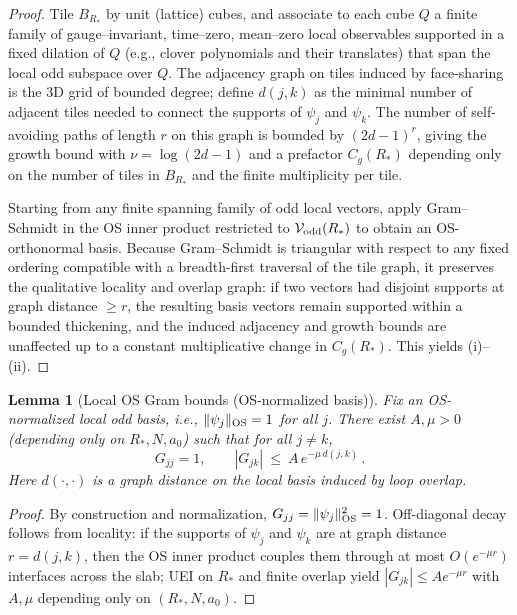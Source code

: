 \documentclass[11pt]{amsart}
\theoremstyle{plain}
\newtheorem{lemma}[theorem]{Lemma}
\theoremstyle{definition}
\theoremstyle{remark}
\begin{document}
\begin{proof}
Tile $B_{R_*}$ by unit (lattice) cubes, and associate to each cube $Q$ a finite family of gauge--invariant, time--zero, mean--zero local observables supported in a fixed dilation of $Q$ (e.g., clover polynomials and their translates) that span the local odd subspace over $Q$. The adjacency graph on tiles induced by face-sharing is the 3D grid of bounded degree; define $d(j,k)$ as the minimal number of adjacent tiles needed to connect the supports of $\psi_j$ and $\psi_k$. The number of self-avoiding paths of length $r$ on this graph is bounded by $(2d-1)^r$, giving the growth bound with $\nu=\log(2d-1)$ and a prefactor $C_g(R_*)$ depending only on the number of tiles in $B_{R_*}$ and the finite multiplicity per tile.

Starting from any finite spanning family of odd local vectors, apply Gram--Schmidt in the OS inner product restricted to $\mathcal{V}_{\rm odd}(R_*)$ to obtain an OS-orthonormal basis. Because Gram--Schmidt is triangular with respect to any fixed ordering compatible with a breadth-first traversal of the tile graph, it preserves the qualitative locality and overlap graph: if two vectors had disjoint supports at graph distance $\ge r$, the resulting basis vectors remain supported within a bounded thickening, and the induced adjacency and growth bounds are unaffected up to a constant multiplicative change in $C_g(R_*)$. This yields (i)--(ii).
\end{proof}

\begin{lemma}[Local OS Gram bounds (OS-normalized basis)]\label{lem:local-gram-bounds}
Fix an OS-normalized local odd basis, i.e., $\|\psi_j\|_{\rm OS}=1$ for all $j$. There exist $A,\mu>0$ (depending only on $R_*,N,a_0$) such that for all $j\ne k$,
\[
  G_{jj}=1,\qquad |G_{jk}|\ \le\ A\,e^{-\mu\, d(j,k)}\,.
\]
Here $d(\cdot,\cdot)$ is a graph distance on the local basis induced by loop overlap.
\end{lemma}

\begin{proof}
By construction and normalization, $G_{jj}=\|\psi_j\|_{\rm OS}^2=1$. Off-diagonal decay follows from locality: if the supports of $\psi_j$ and $\psi_k$ are at graph distance $r=d(j,k)$, then the OS inner product couples them through at most $O(e^{-\mu r})$ interfaces across the slab; UEI on $R_*$ and finite overlap yield $|G_{jk}|\le A e^{-\mu r}$ with $A,\mu$ depending only on $(R_*,N,a_0)$.
\end{proof}
\end{document}
